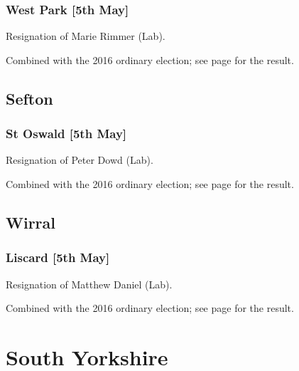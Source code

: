 \documentclass[a4paper,openany]{book}
\begin{document}
\begin{resultsiii}
\subsubsection*{West Park \hspace*{\fill}\nolinebreak[1]%
\enspace\hspace*{\fill}
[5th May]}


Resignation of Marie Rimmer (Lab).

Combined with the 2016 ordinary election; see page \pageref{WestParkStHelens} for the result.

\subsection*{Sefton}

\subsubsection*{St Oswald \hspace*{\fill}\nolinebreak[1]%
\enspace\hspace*{\fill}
[5th May]}


Resignation of Peter Dowd (Lab).

Combined with the 2016 ordinary election; see page \pageref{StOswaldSefton} for the result.

\subsection*{Wirral}

\subsubsection*{Liscard \hspace*{\fill}\nolinebreak[1]%
\enspace\hspace*{\fill}
[5th May]}


Resignation of Matthew Daniel (Lab).

Combined with the 2016 ordinary election; see page \pageref{LiscardWirral} for the result.

\section{South Yorkshire}


\end{resultsiii}
\end{document}
